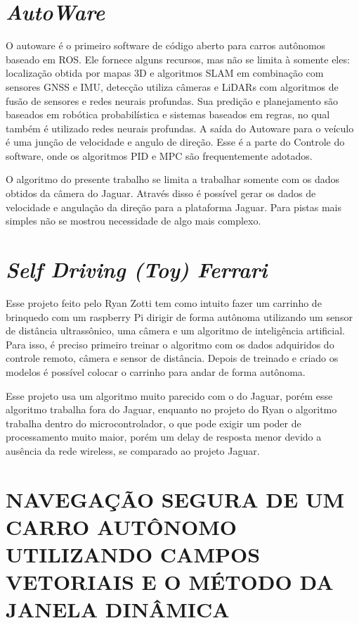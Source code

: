 \section{\textit{AutoWare}}

O autoware é o primeiro software de código aberto para carros autônomos baseado em ROS. Ele fornece alguns recursos, mas não se limita à somente eles: localização obtida por mapas 3D e algoritmos SLAM em combinação com sensores GNSS e IMU, detecção utiliza câmeras e LiDARs com algoritmos de fusão de sensores e redes neurais profundas. Sua predição e planejamento são baseados em robótica probabilística e sistemas baseados em regras, no qual também é utilizado redes neurais profundas. A saída do Autoware para o veículo é uma junção de velocidade e angulo de direção. Esse é a parte do Controle do software, onde os algoritmos PID e MPC são frequentemente adotados. \cite{autoware}

O algoritmo do presente trabalho se limita a trabalhar somente com os dados obtidos da câmera do Jaguar. Através disso é possível gerar os dados de velocidade e angulação da direção para a plataforma Jaguar. Para pistas mais simples não se mostrou necessidade de algo mais complexo.

\section{\textit{Self Driving (Toy) Ferrari}}
\label{Self_Driving_(Toy)_Ferrari}

Esse projeto feito pelo Ryan Zotti tem como intuito fazer um carrinho de brinquedo com um raspberry Pi dirigir de forma autônoma utilizando um sensor de distância ultrassônico, uma câmera e um algoritmo de inteligência artificial. Para isso, é preciso primeiro treinar o algoritmo com os dados adquiridos do controle remoto, câmera e sensor de distância. Depois de treinado e criado os modelos é possível colocar o carrinho para andar de forma autônoma. \cite{selfdrivingcartoy}

Esse projeto usa um algoritmo muito parecido com o do Jaguar, porém esse algoritmo trabalha fora do Jaguar, enquanto no projeto do Ryan o algoritmo trabalha dentro do microcontrolador, o que pode exigir um poder de processamento muito maior, porém um delay de resposta menor devido a ausência da rede wireless, se comparado ao projeto Jaguar.

\section{NAVEGAÇÃO SEGURA DE UM CARRO AUTÔNOMO UTILIZANDO CAMPOS VETORIAIS E O MÉTODO DA JANELA DINÂMICA}
\label{NAVEGAÇÃO_SEGURA}

